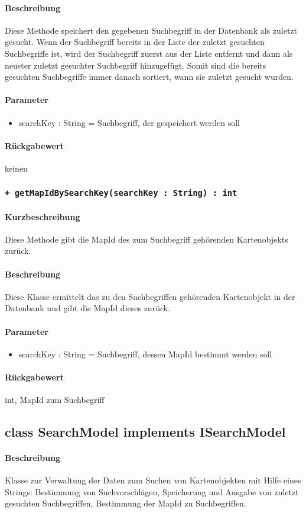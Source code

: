\paragraph*{Beschreibung}
Diese Methode speichert den gegebenen Suchbegriff in der Datenbank als zuletzt gesucht.
Wenn der Suchbegriff bereits in der Liste der zuletzt gesuchten Suchbegriffe ist, 
wird der Suchbegriff zuerst aus der Liste entfernt und dann als neuster zuletzt gesuchter Suchbegriff hinzugefügt.
Somit sind die bereits gesuchten Suchbegriffe immer danach sortiert, wann sie zuletzt gesucht wurden.
\paragraph*{Parameter}
\begin{itemize}
    \item searchKey : String = Suchbegriff, der gespeichert werden soll
\end{itemize}
\paragraph*{Rückgabewert}
keinen

\subsubsection{\texttt{+ getMapIdBySearchKey(searchKey : String) : int}}%
\paragraph*{Kurzbeschreibung}
Diese Methode gibt die MapId des zum Suchbegriff gehörenden Kartenobjekts zurück.
\paragraph*{Beschreibung}
Diese Klasse ermittelt das zu den Suchbegriffen gehörenden Kartenobjekt in der Datenbank und gibt die MapId dieses zurück.
\paragraph*{Parameter}
\begin{itemize}
    \item searchKey : String = Suchbegriff, dessen MapId bestimmt werden soll
\end{itemize}
\paragraph*{Rückgabewert}
int, MapId zum Suchbegriff

\subsection{class SearchModel implements ISearchModel}
\paragraph*{Beschreibung}
Klasse zur Verwaltung der Daten zum Suchen von Kartenobjekten mit Hilfe eines Strings: 
Bestimmung von Suchvorschlägen, Speicherung und Ausgabe von zuletzt gesuchten Suchbegriffen, Bestimmung der MapId zu Suchbegriffen.